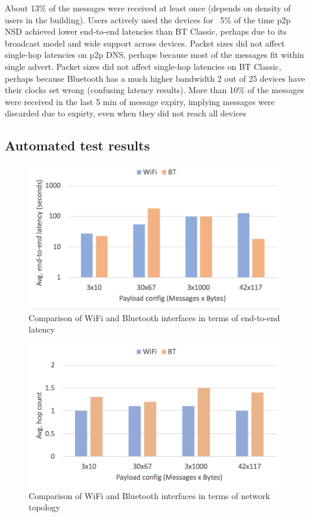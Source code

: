\documentclass[conference]{IEEEtran}
\begin{document}
About 13\% of the messages were received at least once (depends on
density of users in the building). Users actively used the devices for
~5\% of the time p2p NSD achieved lower end-to-end latencies than BT
Classic, perhaps due to its broadcast model and wide support across
devices. Packet sizes did not affect single-hop latencies on p2p DNS,
perhaps because most of the messages fit within single advert. Packet
sizes did not affect single-hop latencies on BT Classic, perhaps
because Bluetooth has a much higher bandwidth 2 out of 25 devices have
their clocks set wrong (confusing latency results). More than 10\% of
the messages were received in the last 5 min of message expiry,
implying messages were discarded due to expirty, even when they did
not reach all devices

%
\subsection{Automated test results}
\label{sec:automated}
%
\begin{figure}[htbp]
\centerline{\includegraphics[width=\columnwidth]{figs/variety_e2e_latency}}
\caption{Comparison of WiFi and Bluetooth interfaces in terms of
  end-to-end latency}
\label{fig:variety_e2e}
\end{figure}

\begin{figure}[htbp]
\centerline{\includegraphics[width=\columnwidth]{figs/variety_hops}}
\caption{Comparison of WiFi and Bluetooth interfaces in terms of
  network topology}
\label{fig:variety_hops}
\end{figure}
\end{document}
